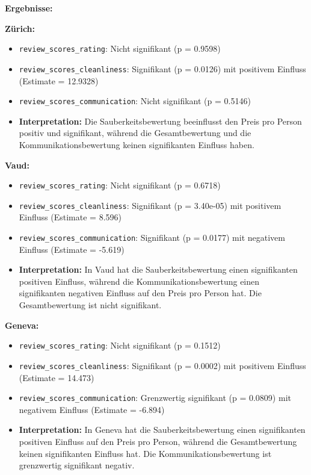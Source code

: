 \documentclass[
  journal,
]{IEEEtran}%
\begin{document}
\textbf{Ergebnisse:}

\textbf{Zürich:}

\begin{itemize}
\item
  \texttt{review\_scores\_rating}: Nicht signifikant (p = 0.9598)
\item
  \texttt{review\_scores\_cleanliness}: Signifikant (p = 0.0126) mit
  positivem Einfluss (Estimate = 12.9328)
\item
  \texttt{review\_scores\_communication}: Nicht signifikant (p = 0.5146)
\item
  \textbf{Interpretation:} Die Sauberkeitsbewertung beeinflusst den
  Preis pro Person positiv und signifikant, während die Gesamtbewertung
  und die Kommunikationsbewertung keinen signifikanten Einfluss haben.
\end{itemize}

\textbf{Vaud:}

\begin{itemize}
\item
  \texttt{review\_scores\_rating}: Nicht signifikant (p = 0.6718)
\item
  \texttt{review\_scores\_cleanliness}: Signifikant (p = 3.40e-05) mit
  positivem Einfluss (Estimate = 8.596)
\item
  \texttt{review\_scores\_communication}: Signifikant (p = 0.0177) mit
  negativem Einfluss (Estimate = -5.619)
\item
  \textbf{Interpretation:} In Vaud hat die Sauberkeitsbewertung einen
  signifikanten positiven Einfluss, während die Kommunikationsbewertung
  einen signifikanten negativen Einfluss auf den Preis pro Person hat.
  Die Gesamtbewertung ist nicht signifikant.
\end{itemize}

\textbf{Geneva:}

\begin{itemize}
\item
  \texttt{review\_scores\_rating}: Nicht signifikant (p = 0.1512)
\item
  \texttt{review\_scores\_cleanliness}: Signifikant (p = 0.0002) mit
  positivem Einfluss (Estimate = 14.473)
\item
  \texttt{review\_scores\_communication}: Grenzwertig signifikant (p =
  0.0809) mit negativem Einfluss (Estimate = -6.894)
\item
  \textbf{Interpretation:} In Geneva hat die Sauberkeitsbewertung einen
  signifikanten positiven Einfluss auf den Preis pro Person, während die
  Gesamtbewertung keinen signifikanten Einfluss hat. Die
  Kommunikationsbewertung ist grenzwertig signifikant negativ.
\end{itemize}
\end{document}
